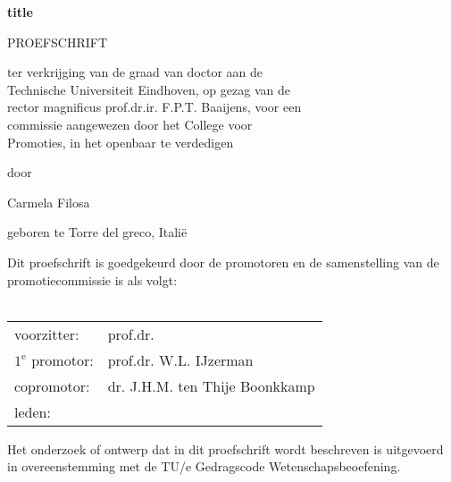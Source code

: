 \begin{center}
\begin{large}
\vspace*{3cm}
\textbf{title}

\vspace*{2cm}

PROEFSCHRIFT

\vspace*{1.5cm}

ter verkrijging van de graad van doctor aan de \\ Technische Universiteit Eindhoven, op gezag van de \\ rector magnificus prof.dr.ir. F.P.T. Baaijens, voor een \\ commissie aangewezen door het College voor \\ Promoties, in het openbaar te verdedigen \\ %






\vspace*{1.5cm}

door

\vspace*{1.5cm}

Carmela Filosa

\vspace*{1.5cm}

geboren te Torre del greco, Itali\"e 

\end{large}
\end{center}

\clearpage
\thispagestyle{plain}
\begin{large}
\noindent Dit proefschrift is goedgekeurd door de promotoren en de samenstelling van de promotiecommissie is als volgt:\\
\vspace{0.4cm}\\
\begin{tabular}{ll}
voorzitter: & prof.dr. \\
$1^{\text{e}}$ promotor: & prof.dr. W.L. IJzerman \\
copromotor: &  dr. J.H.M. ten Thije Boonkkamp \\
leden: %
\end{tabular}

\vspace*{10cm}
\noindent Het onderzoek of ontwerp dat in dit proefschrift  wordt beschreven is uitgevoerd in overeenstemming met de TU/e Gedragscode Wetenschapsbeoefening.
\end{large}
\clearpage

